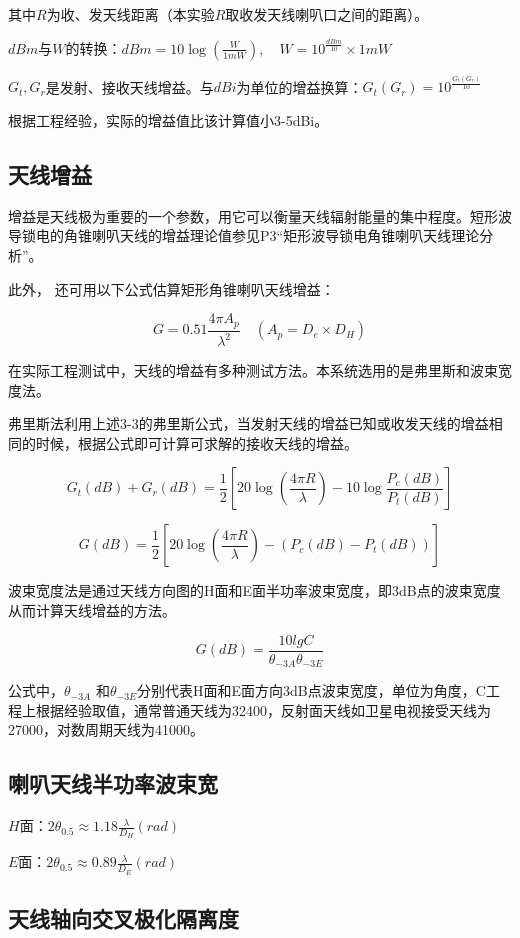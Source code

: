 \documentclass[12pt,a4paper,UTF8]{article}
\begin{document}
其中$R$为收、发天线距离（本实验$R$取收发天线喇叭口之间的距离）。

$dBm$与$W$的转换：$dBm = 10\log\left(\frac{W}{1mW}\right), \quad W = 10^{\frac{dBm}{10}} \times 1mW$

$G_t, G_r$是发射、接收天线增益。与$dBi$为单位的增益换算：$G_t(G_r) = 10^{\frac{G_t(G_r)}{10}}$

根据工程经验，实际的增益值比该计算值小3-5dBi。

\subsection{天线增益}

增益是天线极为重要的一个参数，用它可以衡量天线辐射能量的集中程度。短形波导锁电的角锥喇叭天线的增益理论值参见P3“矩形波导锁电角锥喇叭天线理论分析”。

此外， 还可用以下公式估算矩形角锥喇叭天线增益：

\[
G = 0.51 \frac{4\pi A_p}{\lambda^2} \quad (A_p = D_e \times D_H)
\]

在实际工程测试中，天线的增益有多种测试方法。本系统选用的是弗里斯和波束宽度法。

弗里斯法利用上述3-3的弗里斯公式，当发射天线的增益已知或收发天线的增益相同的时候，根据公式即可计算可求解的接收天线的增益。

\[
G_t(dB) + G_r(dB) = \frac{1}{2} \left[20\log \left( \frac{4\pi R}{\lambda}\right) - 10\log \frac{P_c(dB) } {P_t(dB)}\right]
\]

\[
G(dB) = \frac{1}{2}\left[20\log \left( \frac{4\pi R}{\lambda}\right) - (P_c(dB) - P_t(dB))\right]
\]

波束宽度法是通过天线方向图的H面和E面半功率波束宽度，即3dB点的波束宽度从而计算天线增益的方法。

\[
G(dB)=\frac{10lgC}{\theta_{-3A}\theta_{-3E}}
\]

公式中，$\theta_{-3A}$ 和$\theta_{-3E}$分别代表H面和E面方向3dB点波束宽度，单位为角度，C工程上根据经验取值，通常普通天线为32400，反射面天线如卫星电视接受天线为27000，对数周期天线为41000。

\subsection{喇叭天线半功率波束宽}

${H}$面：$2\theta_{0.5}\approx1.18\frac\lambda{D_H}(rad)$

${E}$面：$2\theta_{0.5}\approx0.89\frac\lambda{D_E}(rad)$


\subsection{天线轴向交叉极化隔离度}
\end{document}
